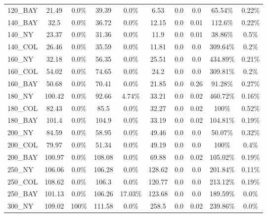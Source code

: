 \documentclass[main.tex]{subfiles}
\begin{document}
\begin{center}
\begin{tabular}{lccccccccc}
120\_BAY & 21.49 & 0.0\% & 39.39 & 0.0\% & 6.53 & 0.0 & 0.0 & 65.54\% & 0.22\%\\
140\_BAY & 32.5 & 0.0\% & 36.72 & 0.0\% & 12.15 & 0.0 & 0.01 & 112.6\% & 0.22\%\\
140\_NY & 23.37 & 0.0\% & 31.36 & 0.0\% & 11.9 & 0.0 & 0.01 & 38.86\% & 0.5\%\\
140\_COL & 26.46 & 0.0\% & 35.59 & 0.0\% & 11.81 & 0.0 & 0.0 & 309.64\% & 0.2\%\\
160\_NY & 32.18 & 0.0\% & 56.35 & 0.0\% & 25.51 & 0.0 & 0.0 & 434.89\% & 0.21\%\\
160\_COL & 54.02 & 0.0\% & 74.65 & 0.0\% & 24.2 & 0.0 & 0.0 & 309.81\% & 0.2\%\\
160\_BAY & 50.68 & 0.0\% & 70.41 & 0.0\% & 21.85 & 0.0 & 0.26 & 91.28\% & 0.27\%\\
180\_NY & 100.42 & 0.0\% & 92.66 & 4.74\% & 33.21 & 0.0 & 0.02 & 460.72\% & 0.16\%\\
180\_COL & 82.43 & 0.0\% & 85.5 & 0.0\% & 32.27 & 0.0 & 0.02 &  100\%  & 0.52\%\\
180\_BAY & 101.4 & 0.0\% & 104.9 & 0.0\% & 33.19 & 0.0 & 0.02 & 104.81\% & 0.19\%\\
200\_NY & 84.59 & 0.0\% & 58.95 & 0.0\% & 49.46 & 0.0 & 0.0 & 50.07\% & 0.32\%\\
200\_COL & 79.97 & 0.0\% & 51.34 & 0.0\% & 49.19 & 0.0 & 0.0 &  100\%  & 0.4\%\\
200\_BAY & 100.97 & 0.0\% & 108.08 & 0.0\% & 69.88 & 0.0 & 0.02 & 105.02\% & 0.19\%\\
250\_NY & 106.06 & 0.0\% & 106.28 & 0.0\% & 128.62 & 0.0 & 0.0 & 201.84\% & 0.11\%\\
250\_COL & 108.62 & 0.0\% & 106.3 & 0.0\% & 120.77 & 0.0 & 0.0 & 213.12\% & 0.19\%\\
250\_BAY & 101.13 & 0.0\% & 106.26 & 17.03\% & 123.68 & 0.0 & 0.0 & 189.59\% & 0.0\%\\
300\_NY & 109.02 &  100\%  & 111.58 & 0.0\% & 258.5 & 0.0 & 0.02 & 239.86\% & 0.0\%\\
\hline\end{tabular}
\end{center}
\newpage
\end{document}
